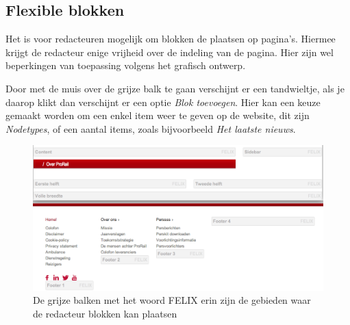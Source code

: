 
\subsection{Flexible blokken}\label{felix}
Het is voor redacteuren mogelijk om blokken de plaatsen op pagina's. Hiermee krijgt de redacteur enige vrijheid over de indeling van de pagina. Hier zijn wel beperkingen van toepassing volgens het grafisch ontwerp.

Door met de muis over de grijze balk te gaan verschijnt er een tandwieltje, als je daarop klikt dan verschijnt er een optie \emph{Blok toevoegen}. Hier kan een keuze gemaakt worden om een enkel item weer te geven op de website, dit zijn \emph{Nodetypes}, of een aantal items, zoals bijvoorbeeld \emph{Het laatste nieuws}.

\begin{figure}[p]
\centering
\includegraphics[width=\textwidth]{img/felix.png}
\caption{De grijze balken met het woord FELIX erin zijn de gebieden waar de redacteur blokken kan plaatsen}
\label{fig:felix_image}
\end{figure}